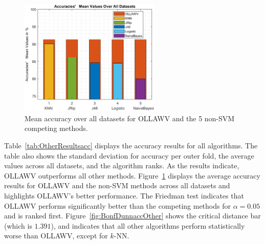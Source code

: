 \documentclass[reqno]{vcuthesis}
\numberwithin{equation}{chapter}
\begin{document}
\begin{table}[t!]
\begin{minipage}{0.9\textwidth}
{}
\captionsetup{width=\linewidth}\vspace{-2em}
\label{fig:BonfDunnaccOther}\vspace{-3em}
\end{minipage}
\end{table}

\begin{figure}
\centering
\includegraphics[width=0.6\textwidth]{figures/others.eps}
\caption{\small Mean accuracy over all datasets for OLLAWV and the 5 non-SVM competing methods.}
\label{fig:accother}
\end{figure}
Table~\ref{tab:OtherResultsacc} displays the accuracy results for all algorithms. The table also shows the standard deviation for accuracy per outer fold, the average values across all datasets, and the algorithm ranks. As the results indicate, OLLAWV outperforms all other methods. Figure~\ref{fig:accother} displays the average accuracy results for OLLAWV and the non-SVM methods across all datasets and highlights OLLAWV's better performance. The Friedman test indicates that OLLAWV performs significantly better than the competing methods for $\alpha = 0.05$ and is ranked first. Figure~\ref{fig:BonfDunnaccOther} shows the critical distance bar (which is $1.391$), and indicates that all other algorithms perform statistically worse than OLLAWV, except for $k$-NN. 
\end{document}
